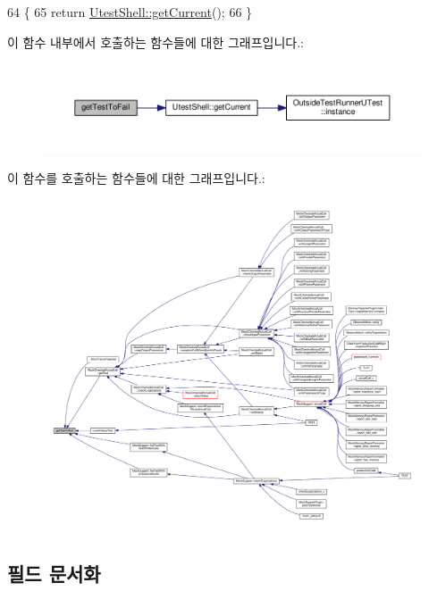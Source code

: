\begin{DoxyCode}
64 \{
65     \textcolor{keywordflow}{return} \hyperlink{class_utest_shell_afeb97f1f06324a42444c71b412655122}{UtestShell::getCurrent}();
66 \}
\end{DoxyCode}


이 함수 내부에서 호출하는 함수들에 대한 그래프입니다.\+:
\nopagebreak
\begin{figure}[H]
\begin{center}
\leavevmode
\includegraphics[width=350pt]{class_mock_failure_reporter_ae3f75fac53b4d3395e02ee8eca858422_cgraph}
\end{center}
\end{figure}




이 함수를 호출하는 함수들에 대한 그래프입니다.\+:
\nopagebreak
\begin{figure}[H]
\begin{center}
\leavevmode
\includegraphics[width=350pt]{class_mock_failure_reporter_ae3f75fac53b4d3395e02ee8eca858422_icgraph}
\end{center}
\end{figure}




\subsection{필드 문서화}
